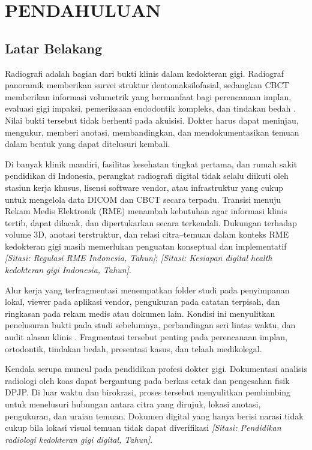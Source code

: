 \documentclass[12pt,a4paper,oneside]{report}
\newcommand{\sitasi}[1]{\textit{[Sitasi: #1]}}
\begin{document}
\tableofcontents
\listoftables
\clearpage
{}
\setcounter{page}{1}

\chapter{PENDAHULUAN}
\label{bab:pendahuluan-lengkap}
\section{Latar Belakang}

Radiografi adalah bagian dari bukti klinis dalam kedokteran gigi. Radiograf panoramik memberikan survei struktur dentomaksilofasial, sedangkan CBCT memberikan informasi volumetrik yang bermanfaat bagi perencanaan implan, evaluasi gigi impaksi, pemeriksaan endodontik kompleks, dan tindakan bedah \cite{ref:scarfe2008,ref:demagalhaes2025}. Nilai bukti tersebut tidak berhenti pada akuisisi. Dokter harus dapat meninjau, mengukur, memberi anotasi, membandingkan, dan mendokumentasikan temuan dalam bentuk yang dapat ditelusuri kembali.

Di banyak klinik mandiri, fasilitas kesehatan tingkat pertama, dan rumah sakit pendidikan di Indonesia, perangkat radiografi digital tidak selalu diikuti oleh stasiun kerja khusus, lisensi software vendor, atau infrastruktur yang cukup untuk mengelola data DICOM dan CBCT secara terpadu. Transisi menuju Rekam Medis Elektronik (RME) menambah kebutuhan agar informasi klinis tertib, dapat dilacak, dan dipertukarkan secara terkendali. Dukungan terhadap volume 3D, anotasi terstruktur, dan relasi citra--temuan dalam konteks RME kedokteran gigi masih memerlukan penguatan konseptual dan implementatif \sitasi{Regulasi RME Indonesia, Tahun}; \sitasi{Kesiapan digital health kedokteran gigi Indonesia, Tahun}.

Alur kerja yang terfragmentasi menempatkan folder studi pada penyimpanan lokal, viewer pada aplikasi vendor, pengukuran pada catatan terpisah, dan ringkasan pada rekam medis atau dokumen lain. Kondisi ini menyulitkan penelusuran bukti pada studi sebelumnya, perbandingan seri lintas waktu, dan audit alasan klinis \cite{ref:rahim2025,ref:li2022,ref:schwendicke2025}. Fragmentasi tersebut penting pada perencanaan implan, ortodontik, tindakan bedah, presentasi kasus, dan telaah medikolegal.

Kendala serupa muncul pada pendidikan profesi dokter gigi. Dokumentasi analisis radiologi oleh koas dapat bergantung pada berkas cetak dan pengesahan fisik DPJP. Di luar waktu dan birokrasi, proses tersebut menyulitkan pembimbing untuk menelusuri hubungan antara citra yang dirujuk, lokasi anotasi, pengukuran, dan uraian temuan. Dokumen digital yang hanya berisi narasi tidak cukup bila lokasi visual temuan tidak dapat diverifikasi \sitasi{Pendidikan radiologi kedokteran gigi digital, Tahun}.
\end{document}
